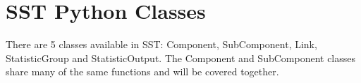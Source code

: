 \chapter{SST Python Classes}

There are 5 classes available in SST: Component, SubComponent, Link,
StatisticGroup and StatisticOutput.  The Component and SubComponent
classes share many of the same functions and will be covered together.









